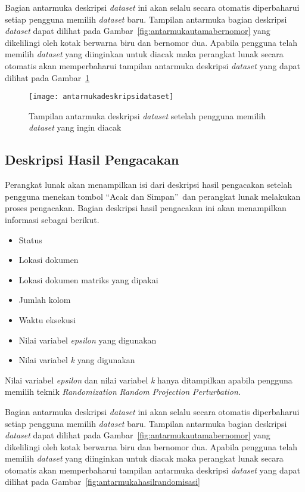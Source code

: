 Bagian antarmuka deskripsi \textit{dataset} ini akan selalu secara otomatis diperbaharui setiap pengguna memilih \textit{dataset} baru. Tampilan antarmuka bagian deskripsi \textit{dataset} dapat dilihat pada Gambar~\ref{fig:antarmukautamabernomor} yang dikelilingi oleh kotak berwarna biru dan bernomor dua. Apabila pengguna telah memilih \textit{dataset} yang diinginkan untuk diacak maka perangkat lunak secara otomatis akan memperbaharui tampilan antarmuka deskripsi \textit{dataset} yang dapat dilihat pada Gambar~\ref{fig:antarmukadeskripsidataset}

\begin{figure}
	\centering
	\texttt{[image: antarmukadeskripsidataset]}
	\caption{Tampilan antarmuka deskripsi \textit{dataset} setelah pengguna memilih \textit{dataset} yang ingin diacak}
	\label{fig:antarmukadeskripsidataset}
\end{figure}

\subsection{Deskripsi Hasil Pengacakan}
\label{subsec:deskripsihasil}

Perangkat lunak akan menampilkan isi dari deskripsi hasil pengacakan setelah pengguna menekan tombol \textquotedblleft Acak dan Simpan\textquotedblright~dan perangkat lunak melakukan proses pengacakan. Bagian deskripsi hasil pengacakan ini akan menampilkan informasi sebagai berikut. 
\begin{itemize}
	\item Status
	\item Lokasi dokumen
	\item Lokasi dokumen matriks yang dipakai
	\item Jumlah kolom
	\item Waktu eksekusi
	\item Nilai variabel \textit{epsilon} yang digunakan
	\item Nilai variabel \textit{k} yang digunakan
\end{itemize}
Nilai variabel \textit{epsilon} dan nilai variabel \textit{k} hanya ditampilkan apabila pengguna memilih teknik \textit{Randomization} \textit{Random Projection Perturbation}.

Bagian antarmuka deskripsi \textit{dataset} ini akan selalu secara otomatis diperbaharui setiap pengguna memilih \textit{dataset} baru. Tampilan antarmuka bagian deskripsi \textit{dataset} dapat dilihat pada Gambar~\ref{fig:antarmukautamabernomor} yang dikelilingi oleh kotak berwarna biru dan bernomor dua. Apabila pengguna telah memilih \textit{dataset} yang diinginkan untuk diacak maka perangkat lunak secara otomatis akan memperbaharui tampilan antarmuka deskripsi \textit{dataset} yang dapat dilihat pada Gambar~\ref{fig:antarmukahasilrandomisasi}

